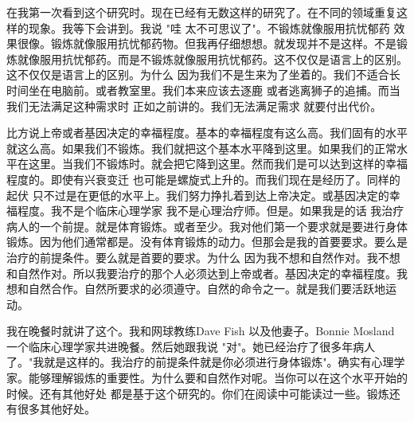 在我第一次看到这个研究时。现在已经有无数这样的研究了。在不同的领域重复这样的现象。我等下会讲到。我说 "哇 太不可思议了"。不锻炼就像服用抗忧郁药 效果很像。锻炼就像服用抗忧郁药物。但我再仔细想想。就发现并不是这样。不是锻炼就像服用抗忧郁药。而是不锻炼就像服用抗忧郁药。这不仅仅是语言上的区别。这不仅仅是语言上的区别。为什么 因为我们不是生来为了坐着的。我们不适合长时间坐在电脑前。或者教室里。我们本来应该去逐鹿 或者逃离狮子的追捕。而当我们无法满足这种需求时 正如之前讲的。我们无法满足需求 就要付出代价。 

比方说上帝或者基因决定的幸福程度。基本的幸福程度有这么高。我们固有的水平就这么高。如果我们不锻炼。我们就把这个基本水平降到这里。如果我们的正常水平在这里。当我们不锻炼时。就会把它降到这里。然而我们是可以达到这样的幸福程度的。即使有兴衰变迁 也可能是螺旋式上升的。而我们现在是经历了。同样的起伏 只不过是在更低的水平上。我们努力挣扎着到达上帝决定。或基因决定的幸福程度。我不是个临床心理学家 我不是心理治疗师。但是。如果我是的话 我治疗病人的一个前提。就是体育锻炼。或者至少。我对他们第一个要求就是要进行身体锻炼。因为他们通常都是。没有体育锻炼的动力。但那会是我的首要要求。要么是治疗的前提条件。要么就是首要的要求。为什么 因为我不想和自然作对。我不想和自然作对。所以我要治疗的那个人必须达到上帝或者。基因决定的幸福程度。我想和自然合作。自然所要求的必须遵守。自然的命令之一。就是我们要活跃地运动。 

我在晚餐时就讲了这个。我和网球教练Dave Fish 以及他妻子。Bonnie Mosland 一个临床心理学家共进晚餐。然后她跟我说 "对"。她已经治疗了很多年病人了。"我就是这样的。我治疗的前提条件就是你必须进行身体锻炼"。确实有心理学家。能够理解锻炼的重要性。为什么要和自然作对呢。当你可以在这个水平开始的时候。还有其他好处 都是基于这个研究的。你们在阅读中可能读过一些。锻炼还有很多其他好处。 

